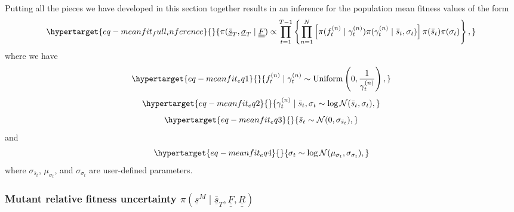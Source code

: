 \documentclass[
  letterpaper,
  DIV=11,
  numbers=noendperiod]{scrartcl}
\begin{document}
\begin{refsegment}
Putting all the pieces we have developed in this section together
results in an inference for the population mean fitness values of the
form \begin{equation}\protect\hypertarget{eq-meanfit_full_inference}{}{
\pi(
    \underline{\bar{s}}_T, \underline{\sigma}_T \mid \underline{\underline{F}}
) \propto
\prod_{t=1}^{T-1} \left\{
    \prod_{n=1}^N \left[
        \pi(f_t^{(n)} \mid \gamma_t^{(n)}) 
        \pi(\gamma_t^{(n)} \mid \bar{s}_t, \sigma_t)
    \right]
    \pi(\bar{s}_t) \pi(\sigma_t)
\right\},
}\label{eq-meanfit_full_inference}\end{equation} where we have
\begin{equation}\protect\hypertarget{eq-meanfit_eq1}{}{
f_t^{(n)} \mid \gamma_t^{(n)} \sim 
\operatorname{Uniform} \left(0, \frac{1}{\gamma_t^{(n)}} \right),
}\label{eq-meanfit_eq1}\end{equation}
\begin{equation}\protect\hypertarget{eq-meanfit_eq2}{}{
\gamma_t^{(n)} \mid \bar{s}_t, \sigma_t \sim 
\log\mathcal{N}(\bar{s}_t, \sigma_t),
}\label{eq-meanfit_eq2}\end{equation}
\begin{equation}\protect\hypertarget{eq-meanfit_eq3}{}{
\bar{s}_t \sim \mathcal{N}(0, \sigma_{\bar{s}_t}),
}\label{eq-meanfit_eq3}\end{equation} and
\begin{equation}\protect\hypertarget{eq-meanfit_eq4}{}{
\sigma_t \sim \log\mathcal{N}(\mu_{\sigma_t}, \sigma_{\sigma_t}),
}\label{eq-meanfit_eq4}\end{equation} where \(\sigma_{\bar{s}_t}\),
\(\mu_{\sigma_t}\), and \(\sigma_{\sigma_t}\) are user-defined
parameters.

\hypertarget{sec-bayes_mutfit}{%
\subsubsection{\texorpdfstring{Mutant relative fitness uncertainty
\(\pi(\underline{s}^M \mid \underline{\bar{s}}_T, \underline{\underline{F}}, \underline{\underline{R}})\)}{Mutant relative fitness uncertainty \textbackslash pi(\textbackslash underline\{s\}\^{}M \textbackslash mid \textbackslash underline\{\textbackslash bar\{s\}\}\_T, \textbackslash underline\{\textbackslash underline\{F\}\}, \textbackslash underline\{\textbackslash underline\{R\}\})}}\label{sec-bayes_mutfit}}


\end{refsegment}
\end{document}
